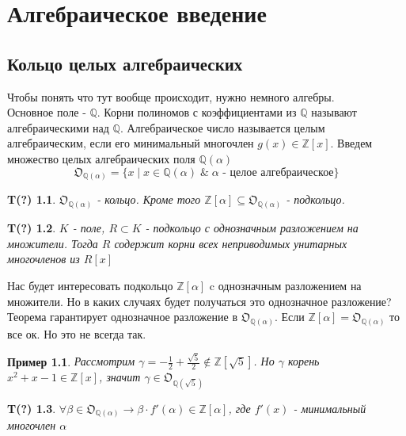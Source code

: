 \documentclass[oneside,final,14pt]{extreport}
\theoremstyle{plain}
\begin{document}
\tableofcontents
\chapter{Алгебраическое введение}
\section{Кольцо целых алгебраических}
Чтобы понять что тут вообще происходит, нужно немного алгебры.\\
Основное поле - $\mathbb{Q}$. Корни полиномов с коэффициентами из 
$\mathbb{Q}$ называют алгебраическими над $\mathbb{Q}$. Алгебраическое число называется целым алгебраическим, если его минимальный многочлен $g(x) \in \mathbb{Z}[x]$. Введем множество целых алгебраических поля 
$\mathbb{Q}(\alpha)$
$$\mathfrak{O}_{\mathbb{Q}(\alpha)}=\{x \;|\; x \in \mathbb{Q}(\alpha
)\; \& \; \alpha\text{ - целое алгебраическое}  \}$$

\newtheorem*{theorem*}{T(?)}
\begin{theorem*}
 $\mathfrak{O}_{\mathbb{Q}(\alpha)}$ - кольцо. Кроме того  $\mathbb{Z}[\alpha] \subseteq \mathfrak{O}_{\mathbb{Q}(\alpha)}$ - подкольцо.
\end{theorem*}


\begin{theorem*}
$K$ - поле, $R \subset K$ - подкольцо с однозначным разложением на множители. Тогда $R$ содержит корни всех неприводимых унитарных многочленов из $R[x]$
\end{theorem*}

Нас будет интересовать подкольцо $\mathbb{Z}[\alpha]$ c однозначным разложением на множители. Но в каких случаях будет получаться это однозначное разложение? Теорема гарантирует однозначное разложение в 
$\mathfrak{O}_{\mathbb{Q}(\alpha)}$. Если $\mathbb{Z}[\alpha]=\mathfrak{O}_{\mathbb{Q}(\alpha)}$ то все ок. Но это не всегда так.


\newtheorem*{remark*}{Пример}
\begin{remark*}
Рассмотрим $\gamma=-\frac{1}{2}+\frac{\sqrt{5}}{2} \notin \mathbb{Z}[\sqrt{5}]$.
Но $\gamma$ корень $x^2+x-1 \in \mathbb{Z}[x]$, значит $\gamma \in \mathfrak{O}_{\mathbb{Q}(\sqrt{5})}$
\end{remark*}

\begin{theorem*}
$\forall \beta \in \mathfrak{O}_{\mathbb{Q}(\alpha)} \rightarrow \beta \cdot f'(\alpha) \in \mathbb{Z}[\alpha]$, где $f'(x)$ - минимальный многочлен $\alpha$
\end{theorem*}
\end{document}
